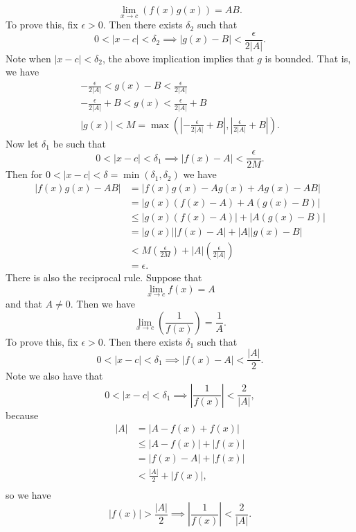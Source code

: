 \documentclass{article}[11pt]
\newcommand{\eps}{\epsilon}
\begin{document}
    $$ \lim_{x \to c} \left(f(x)g(x)\right) = AB .$$
    To prove this, fix $\epsilon > 0$. Then there exists $\delta_2$ such that
    $$ 0 < |x - c| < \delta_2 \implies |g(x) - B| < \frac{\eps}{2|A|} .$$
    Note when $|x - c| < \delta_2$, the above implication implies that $g$ is bounded. That is, we have
    \begin{align*}
        -\frac{\eps}{2|A|} < g(x) - B < \frac{\eps}{2|A|} \\
        -\frac{\eps}{2|A|} + B < g(x) < \frac{\eps}{2|A|} + B \\
        |g(x)| < M = \max\left(\left|-\frac{\eps}{2|A|} + B\right|, \left|\frac{\eps}{2|A|} + B\right|\right).
    \end{align*}
    Now let $\delta_1$ be such that
    $$ 0 < |x - c| < \delta_1 \implies |f(x) - A| < \frac{\eps}{2M} .$$
    Then for $0 < |x - c| < \delta = \min(\delta_1, \delta_2)$ we have
    \begin{align*}
        |f(x)g(x) - AB| &= |f(x)g(x) - Ag(x) + Ag(x) - AB| \\
                        &= |g(x)(f(x) - A) + A(g(x) - B)| \\
                        &\leq |g(x)(f(x) - A)| + |A(g(x) - B)| \\
                        &= |g(x)||f(x) - A| + |A||g(x) - B| \\
                        &< M\left(\frac{\eps}{2M}\right) + |A|\left(\frac{\eps}{2|A|}\right) \\
                        &= \eps.
    \end{align*}
    There is also the reciprocal rule. Suppose that
    $$ \lim_{x \to c} f(x) = A $$
    and that $A \neq 0$. Then we have
    $$ \lim_{x \to c} \left(\frac{1}{f(x)}\right) = \frac{1}{A} .$$
    To prove this, fix $\eps > 0$. Then there exists $\delta_1$ such that
    $$ 0 < |x - c| < \delta_1 \implies |f(x) - A| < \frac{|A|}{2} . $$
    Note we also have that
        $$ 0 < |x - c| < \delta_1 \implies \left| \frac{1}{f(x)} \right| < \frac{2}{|A|} ,$$
    because
    \begin{align*}
        |A| &= |A - f(x) + f(x)| \\
            &\leq |A - f(x)| + |f(x)| \\
            &= |f(x) - A| + |f(x)| \\
            &< \frac{|A|}{2} + |f(x)| ,\\
    \end{align*}
    so we have
    $$ |f(x)| > \frac{|A|}{2} \implies \left| \frac{1}{f(x)} \right| < \frac{2}{|A|} .$$
\end{document}
